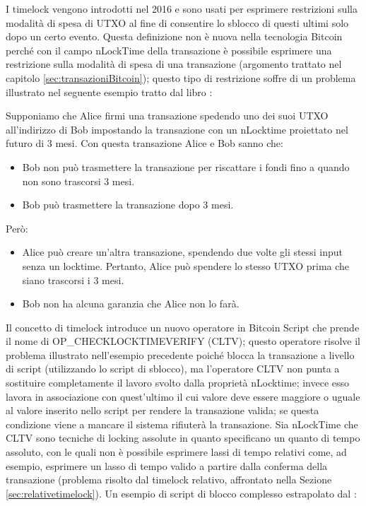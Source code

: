 I timelock vengono introdotti nel 2016 e sono usati per esprimere restrizioni sulla modalità di spesa di UTXO al fine di consentire lo sblocco di questi ultimi solo dopo un certo evento. Questa definizione non è nuova nella tecnologia Bitcoin perché con il campo nLockTime della transazione è possibile esprimere una restrizione sulla modalità di spesa di una transazione (argomento trattato nel capitolo \ref{sec:transazioniBitcoin}); questo tipo di restrizione soffre di un problema illustrato nel seguente esempio tratto dal libro \cite{bitcoinbook}:

Supponiamo che Alice firmi una transazione spedendo uno dei suoi UTXO all'indirizzo di Bob impostando la transazione con un nLocktime proiettato nel futuro di 3 mesi.
Con questa transazione Alice e Bob sanno che:
\begin{itemize}
  \item Bob non può trasmettere la transazione per riscattare i fondi fino a quando non sono trascorsi 3 mesi.
  \item Bob può trasmettere la transazione dopo 3 mesi.
\end{itemize}
Però:
\begin{itemize}
  \item Alice può creare un'altra transazione, spendendo due volte gli stessi input senza un locktime. Pertanto, Alice può spendere lo stesso UTXO prima che siano trascorsi i 3 mesi.
  \item Bob non ha alcuna garanzia che Alice non lo farà.
\end{itemize}
Il concetto di timelock introduce un nuovo operatore in Bitcoin Script che prende il nome di OP\_CHECKLOCKTIMEVERIFY (CLTV); questo operatore risolve il problema illustrato nell’esempio precedente poiché blocca la  transazione a livello di script (utilizzando lo script di sblocco), ma l’operatore CLTV non punta a sostituire completamente il lavoro svolto dalla proprietà nLocktime; invece esso lavora in associazione con quest’ultimo il cui valore deve essere maggiore o uguale al valore inserito nello script per rendere la transazione valida; se questa condizione viene a mancare il sistema rifiuterà la transazione.
Sia nLockTime che CLTV sono tecniche di locking assolute in quanto specificano un quanto di tempo assoluto, con le quali non è possibile esprimere lassi di tempo relativi come, ad esempio, esprimere un lasso di tempo valido a partire dalla conferma della transazione (problema risolto dal timelock relativo, affrontato nella Sezione \ref{sec:relativetimelock}).
Un esempio di script di blocco complesso estrapolato dal \cite{bitcoinbip:bip68}:

